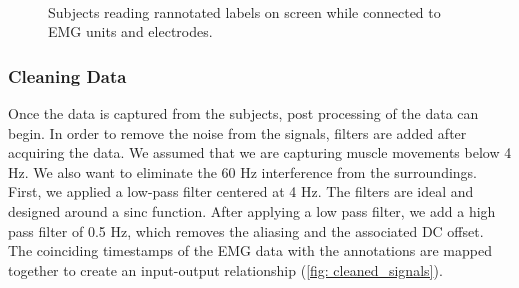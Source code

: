 \documentclass[conference]{IEEEtran}
\begin{document}
\begin{figure} 
    \centering
    \\
  \caption{Subjects reading rannotated labels on screen while connected to EMG units and electrodes.}
  \label{fig: conn-ann} 
\end{figure}

\subsubsection*{Cleaning Data}
Once the data is captured from the subjects, post processing of the data can begin. In order to remove the noise from the signals, filters are added after acquiring the data. We assumed that we are capturing muscle movements below 4 Hz. We also want to eliminate the 60 Hz interference from the surroundings. First, we applied a low-pass filter centered at 4 Hz. The filters are ideal and designed around a sinc function. After applying a low pass filter, we add a high pass filter of 0.5 Hz, which removes the aliasing and the associated DC offset. The coinciding timestamps of the EMG data with the annotations are mapped together to create an input-output relationship (\figurename \ref{fig: cleaned_signals}).
\end{document}

